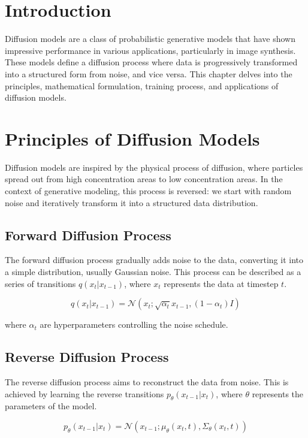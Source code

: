 \section{Introduction}
Diffusion models are a class of probabilistic generative models that have shown impressive performance in various applications, particularly in image synthesis. These models define a diffusion process where data is progressively transformed into a structured form from noise, and vice versa. This chapter delves into the principles, mathematical formulation, training process, and applications of diffusion models.

\section{Principles of Diffusion Models}
Diffusion models are inspired by the physical process of diffusion, where particles spread out from high concentration areas to low concentration areas. In the context of generative modeling, this process is reversed: we start with random noise and iteratively transform it into a structured data distribution.

\subsection{Forward Diffusion Process}
The forward diffusion process gradually adds noise to the data, converting it into a simple distribution, usually Gaussian noise. This process can be described as a series of transitions \( q(x_t | x_{t-1}) \), where \( x_t \) represents the data at timestep \( t \).

\begin{equation}
q(x_t | x_{t-1}) = \mathcal{N}(x_t; \sqrt{\alpha_t} x_{t-1}, (1 - \alpha_t) I)
\end{equation}

where \( \alpha_t \) are hyperparameters controlling the noise schedule.

\subsection{Reverse Diffusion Process}
The reverse diffusion process aims to reconstruct the data from noise. This is achieved by learning the reverse transitions \( p_\theta(x_{t-1} | x_t) \), where \( \theta \) represents the parameters of the model.

\begin{equation}
p_\theta(x_{t-1} | x_t) = \mathcal{N}(x_{t-1}; \mu_\theta(x_t, t), \Sigma_\theta(x_t, t))
\end{equation}

